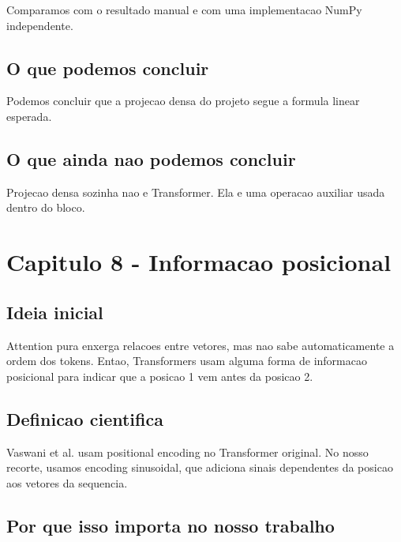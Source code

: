 Comparamos com o resultado manual e com uma implementacao NumPy independente.



\subsection{O que podemos concluir}




Podemos concluir que a projecao densa do projeto segue a formula linear esperada.



\subsection{O que ainda nao podemos concluir}




Projecao densa sozinha nao e Transformer. Ela e uma operacao auxiliar usada dentro do bloco.



\section{Capitulo 8 - Informacao posicional}



\subsection{Ideia inicial}





Attention pura enxerga relacoes entre vetores, mas nao sabe automaticamente a ordem dos tokens. Entao, Transformers usam alguma forma de informacao posicional para indicar que a posicao 1 vem antes da posicao 2.



\subsection{Definicao cientifica}





Vaswani et al. usam positional encoding no Transformer original. No nosso recorte, usamos encoding sinusoidal, que adiciona sinais dependentes da posicao aos vetores da sequencia.



\subsection{Por que isso importa no nosso trabalho}





